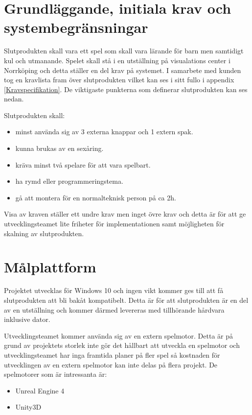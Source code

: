 \documentclass[a4paper,12pt,oneside,final]{extbook}
\begin{document}
\section{Grundläggande, initiala krav och systembegränsningar}
Slutprodukten skall vara ett spel som skall vara lärande för barn men samtidigt kul och utmanande. Spelet skall stå i en utställning på visualations center i Norrköping och detta ställer en del krav på systemet. I samarbete med kunden tog en kravlista fram över slutprodukten vilket kan ses i sitt fullo i appendix \ref{Kravspecifikation}. De viktigaste punkterna som definerar slutprodukten kan ses nedan.

Slutprodukten skall:
\begin{itemize}
	\item minst använda sig av 3 externa knappar och 1 extern spak.
	\item kunna brukas av en sexåring.
	\item kräva minst två spelare för att vara spelbart.
	\item ha rymd eller programmeringstema.
	\item gå att montera för en normalteknisk person på ca 2h.
\end{itemize}

Visa av kraven ställer ett undre krav men inget övre krav och detta är för att ge utvecklingsteamet lite friheter för implementationen samt möjligheten för skalning av slutprodukten.

\section{Målplattform}

Projektet utvecklas för Windows 10 och ingen vikt kommer ges till att få slutprodukten att bli bakåt kompatibelt. Detta är för att slutprodukten är en del av en utställning och kommer därmed levereras med tillhörande hårdvara inklusive dator. 

Utvecklingsteamet kommer använda sig av en extern spelmotor. Detta är på grund av projektets storlek inte gör det hållbart att utveckla en spelmotor och utvecklingsteamet har inga framtida planer på fler spel så kostnaden för utvecklingen av en extern spelmotor kan inte delas på flera projekt. De spelmotorer som är intressanta är:
  
\begin{itemize}
	\item Unreal Engine 4
	\item Unity3D

\end{itemize}
\end{document}
